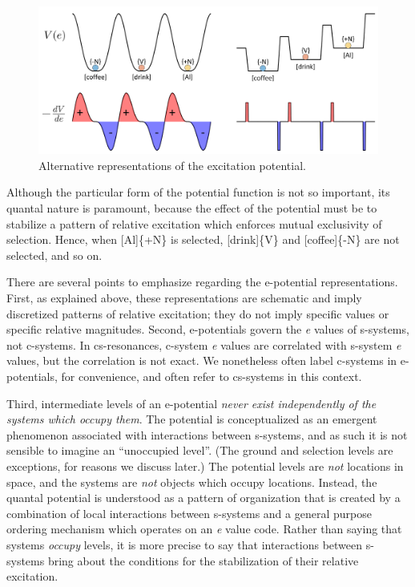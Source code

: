   
\begin{figure}
\includegraphics[width=\textwidth]{figures/Tilsen-img24.png}
\caption{Alternative representations of the excitation potential.}
\label{fig:2:17}
\end{figure}
 

  Although the particular form of the potential function is not so important, its quantal nature is paramount, because the effect of the potential must be to stabilize a pattern of relative excitation which enforces mutual exclusivity of selection. Hence, when [Al]\{+N\} is selected, [drink]\{V\} and [coffee]\{-N\} are not selected, and so on. 

  There are several points to emphasize regarding the e-potential representations. First, as explained above, these representations are schematic and imply discretized patterns of relative excitation; they do not imply specific values or specific relative magnitudes. Second, e-potentials govern the \textit{e} values of s-systems, not c-systems. In cs-resonances, c-system \textit{e} values are correlated with s-system \textit{e} values, but the correlation is not exact. We nonetheless often label c-systems in e-potentials, for convenience, and often refer to cs-systems in this context. 

  Third, intermediate levels of an e-potential \textit{never exist independently of the systems which occupy them}. The potential is conceptualized as an emergent phenomenon associated with interactions between s-systems, and as such it is not sensible to imagine an “unoccupied level”. (The ground and selection levels are exceptions, for reasons we discuss later.) The potential levels are \textit{not} locations in space, and the systems are \textit{not} objects which occupy locations. Instead, the quantal potential is understood as a pattern of organization that is created by a combination of local interactions between s-systems and a general purpose ordering mechanism which operates on an \textit{e} value code. Rather than saying that systems \textit{occupy} levels, it is more precise to say that interactions between s-systems bring about the conditions for the stabilization of their relative excitation.

